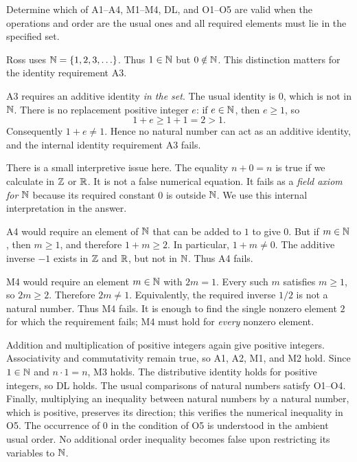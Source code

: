 
\goal Determine which of A1--A4, M1--M4, DL, and O1--O5 are valid when the
operations and order are the usual ones and all required elements must lie
in the specified set.

Ross uses $\mathbb{N}=\{1,2,3,\ldots\}$. Thus $1\in\mathbb{N}$ but $0\notin\mathbb{N}$.
This distinction matters for the identity requirement A3.

A3 requires an additive identity \emph{in the set}. The usual identity is
$0$, which is not in $\mathbb{N}$. There is no replacement positive integer $e$:
if $e\in\mathbb{N}$, then $e\ge1$, so
\[
 1+e\ge1+1=2>1.
\]
Consequently $1+e\ne1$. Hence no natural number can act as an additive
identity, and the internal identity requirement A3 fails.

There is a small interpretive issue here. The equality $n+0=n$ is true if
we calculate in $\mathbb{Z}$ or $\mathbb{R}$. It is not a false numerical equation.
It fails as a \emph{field axiom for $\mathbb{N}$} because its required constant
$0$ is outside $\mathbb{N}$. We use this internal interpretation in the answer.

A4 would require an element of $\mathbb{N}$ that can be added to $1$ to give $0$.
But if $m\in\mathbb{N}$, then $m\ge1$, and therefore $1+m\ge2$.
In particular, $1+m\ne0$. The additive inverse $-1$ exists in $\mathbb{Z}$ and
$\mathbb{R}$, but not in $\mathbb{N}$. Thus A4 fails.

M4 would require an element $m\in\mathbb{N}$ with $2m=1$.
Every such $m$ satisfies $m\ge1$, so $2m\ge2$. Therefore $2m\ne1$.
Equivalently, the required inverse $1/2$ is not a natural number.
Thus M4 fails. It is enough to find the single nonzero element $2$ for
which the requirement fails; M4 must hold for \emph{every} nonzero element.

Addition and multiplication of positive integers again give positive
integers. Associativity and commutativity remain true, so A1, A2, M1,
and M2 hold. Since $1\in\mathbb{N}$ and $n\cdot1=n$, M3 holds. The distributive
identity holds for positive integers, so DL holds. The usual comparisons
of natural numbers satisfy O1--O4. Finally, multiplying an inequality
between natural numbers by a natural number, which is positive, preserves
its direction; this verifies the numerical inequality in O5.
The occurrence of $0$ in the condition of O5 is understood in the ambient
usual order. No additional order inequality becomes false upon
restricting its variables to $\mathbb{N}$.

